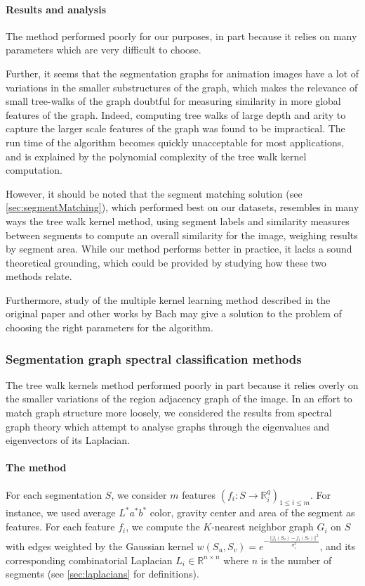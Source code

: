 \paragraph{Results and analysis} The method performed poorly for our purposes, in part because it relies on many parameters which are very difficult to choose.

Further, it seems that the segmentation graphs for animation images have a lot of variations in the smaller substructures of the graph, which makes the relevance of small tree-walks of the graph doubtful for measuring similarity in more global features of the graph. Indeed, computing tree walks of large depth and arity to capture the larger scale features of the graph was found to be impractical. The run time of the algorithm becomes quickly unacceptable for most applications, and is explained by the polynomial complexity of the tree walk kernel computation.

However, it should be noted that the segment matching solution (see \autoref{sec:segmentMatching}), which performed best on our datasets, resembles in many ways the tree walk kernel method, using segment labels and similarity measures between segments to compute an overall similarity for the image, weighing results by segment area. While our method performs better in practice, it lacks a sound theoretical grounding, which could be provided by studying how these two methods relate.

Furthermore, study of the multiple kernel learning method described in the original paper and other works by Bach \cite{bach2004multiple} may give a solution to the problem of choosing the right parameters for the algorithm.

\subsubsection{Segmentation graph spectral classification methods}
The tree walk kernels method performed poorly in part because it relies overly on the smaller variations of the region adjacency graph of the image. In an effort to match graph structure more loosely, we considered the results from spectral graph theory which attempt to analyse graphs through the eigenvalues and eigenvectors of its Laplacian. 

\paragraph{The method} For each segmentation $S$, we consider $m$ features $(f_i : S \rightarrow \mathbb{R}_i^q)_{1 \leq i \leq m}$. For instance, we used average $L^*a^*b^*$ color, gravity center and area of the segment as features. For each feature $f_i$, we compute the $K$-nearest neighbor graph $G_i$ on $S$ with edges weighted by the Gaussian kernel $w(S_u,S_v) = e^{-\frac{||f_i(S_u) - f_i(S_v)||^2}{\sigma_i^2}}$, and its corresponding combinatorial Laplacian  $L_i \in \mathbb{R}^{n \times n}$ where $n$ is the number of segments (see \autoref{sec:laplacians} for definitions).

